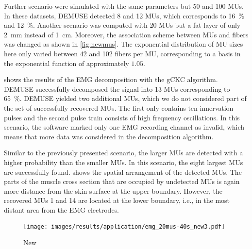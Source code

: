 Further scenario were simulated with the same parameters but 50 and 100 MUs. In these datasets, DEMUSE detected 8 and 12 MUs, which corresponds to \SI{16}{\percent} and \SI{12}{\percent}. Another scenario was computed with 20 MUs but a fat layer of only \SI{2}{\mm} instead of \SI{1}{\cm}. Moreover, the association scheme between MUs and fibers was changed as shown in \cref{fig:newmus}. The exponential distribution of MU sizes here only varied between 42 and 102 fibers per MU, corresponding to a basis in the exponential function of approximately $1.05$. 

 shows the results of the EMG decomposition with the gCKC algorithm. DEMUSE successfully decomposed the signal into 13 MUs corresponding to \SI{65}{\percent}. DEMUSE yielded two additional MUs, which we do not considered part of the set of successfully recovered MUs. The first only contains ten innervation pulses and the second pulse train consists of high frequency oscillations.
In this scenario, the software marked only one EMG recording channel as invalid, which means that more data was considered in the decomposition algorithm.

Similar to the previously presented scenario, the larger MUs are detected with a higher probability than the smaller MUs. In this scenario, the eight largest MUs are successfully found.  shows the spatial arrangement of the detected MUs. The parts of the muscle cross section that are occupied by undetected MUs is again more distance from the skin surface at the upper boundary. However, the recovered MUs 1 and 14 are located at the lower boundary, i.e., in the most distant area from the EMG electrodes. 

\begin{figure}
  \centering%
  \texttt{[image: images/results/application/emg\_20mus-40s\_new3.pdf]}%
  \caption{New}%
  \label{fig:emg_20mus-40s_new}%
\end{figure}


